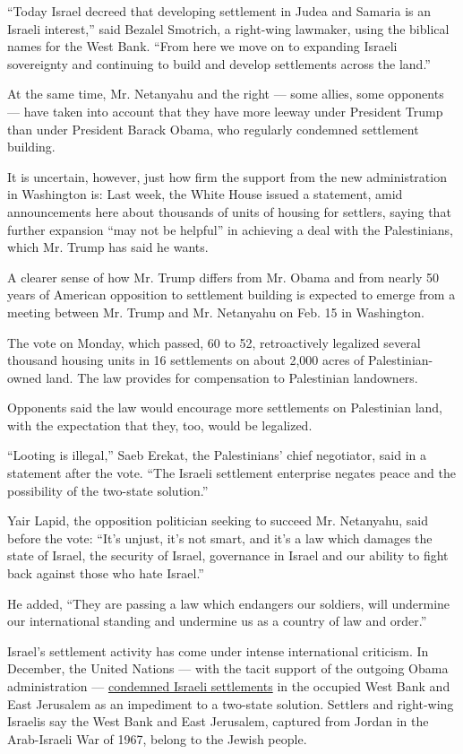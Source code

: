 ``Today Israel decreed that developing settlement in Judea and Samaria
is an Israeli interest,'' said Bezalel Smotrich, a right-wing lawmaker,
using the biblical names for the West Bank. ``From here we move on to
expanding Israeli sovereignty and continuing to build and develop
settlements across the land.''

At the same time, Mr. Netanyahu and the right --- some allies, some
opponents --- have taken into account that they have more leeway under
President Trump than under President Barack Obama, who regularly
condemned settlement building.

It is uncertain, however, just how firm the support from the new
administration in Washington is: Last week, the White House issued a
statement, amid announcements here about thousands of units of housing
for settlers, saying that further expansion ``may not be helpful'' in
achieving a deal with the Palestinians, which Mr. Trump has said he
wants.

A clearer sense of how Mr. Trump differs from Mr. Obama and from nearly
50 years of American opposition to settlement building is expected to
emerge from a meeting between Mr. Trump and Mr. Netanyahu on Feb. 15 in
Washington.

The vote on Monday, which passed, 60 to 52, retroactively legalized
several thousand housing units in 16 settlements on about 2,000 acres of
Palestinian-owned land. The law provides for compensation to Palestinian
landowners.

Opponents said the law would encourage more settlements on Palestinian
land, with the expectation that they, too, would be legalized.

``Looting is illegal,'' Saeb Erekat, the Palestinians' chief negotiator,
said in a statement after the vote. ``The Israeli settlement enterprise
negates peace and the possibility of the two-state solution.''

Yair Lapid, the opposition politician seeking to succeed Mr. Netanyahu,
said before the vote: ``It's unjust, it's not smart, and it's a law
which damages the state of Israel, the security of Israel, governance in
Israel and our ability to fight back against those who hate Israel.''

He added, ``They are passing a law which endangers our soldiers, will
undermine our international standing and undermine us as a country of
law and order.''

Israel's settlement activity has come under intense international
criticism. In December, the United Nations --- with the tacit support of
the outgoing Obama administration ---
\href{https://www.nytimes.com/2016/12/23/world/middleeast/israel-settlements-un-vote.html}{condemned
Israeli settlements} in the occupied West Bank and East Jerusalem as an
impediment to a two-state solution. Settlers and right-wing Israelis say
the West Bank and East Jerusalem, captured from Jordan in the
Arab-Israeli War of 1967, belong to the Jewish people.

